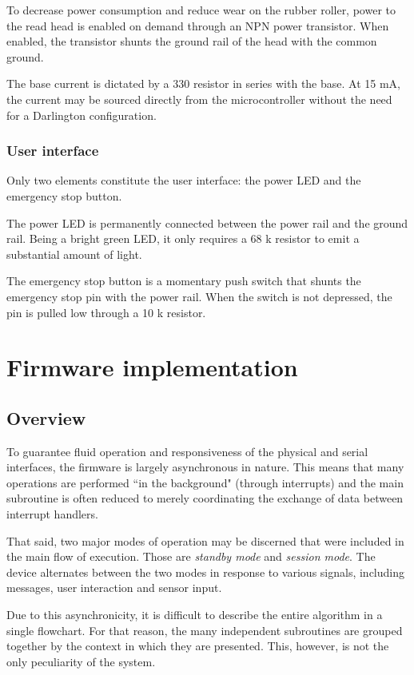 \documentclass{article}
\begin{document}
	To decrease power consumption and reduce wear on the rubber roller, power
	to the read head is enabled on demand through an NPN power transistor.
	When enabled, the transistor shunts the ground rail of the head with the
	common ground.
	
	The base current is dictated by a 330 \textOmega {} resistor in series with
	the base. At 15 mA, the current may be sourced directly from the
	microcontroller without the need for a Darlington configuration.
	
	\subsubsection{User interface}
	
	Only two elements constitute the user interface: the power LED and the
	emergency stop button.
	
	The power LED is permanently connected between the power rail and the
	ground rail. Being a bright green LED, it only requires a 68 k\textOmega {}
	resistor to emit a substantial amount of light.
	
	The emergency stop button is a momentary push switch that shunts the
	emergency stop pin with the power rail. When the switch is not depressed,
	the pin is pulled low through a 10 k\textOmega {} resistor.
	
	\newpage
	\section{Firmware implementation}
	
	\subsection{Overview}
	
	To guarantee fluid operation and responsiveness of the physical and serial
	interfaces, the firmware is largely asynchronous in nature. This means that
	many operations are performed ``in the background" (through interrupts) and
	the main subroutine is often reduced to merely coordinating the exchange of
	data between interrupt handlers.
	
	That said, two major modes of operation may be discerned that were included
	in the main flow of execution. Those are \textit{standby mode} and
	\textit{session mode}. The device alternates between the two modes in
	response to various signals, including messages, user interaction and
	sensor input.
	
	Due to this asynchronicity, it is difficult to describe the entire
	algorithm in a single flowchart. For that reason, the many independent
	subroutines are grouped together by the context in which they are
	presented. This, however, is not the only peculiarity of the system.
	
\end{document}

